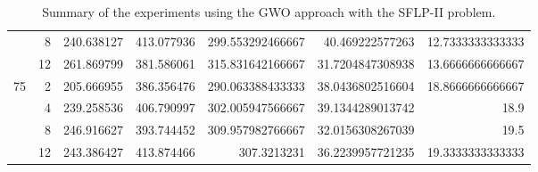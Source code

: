 \begin{table}
{{\begin{tabular}{|r|r|r|r|r|r|r|}
	\cline{2-7}
	& 8                               & 240.638127                         & 413.077936                          & 299.553292466667                   & 40.469222577263                         & 12.7333333333333                                \\ 
	\cline{2-7}
	& 12                              & 261.869799                         & 381.586061                          & 315.831642166667                   & 31.7204847308938                        & 13.6666666666667                                \\ 
	\hline
	\multirow{4}{*}{75}                      & 2                               & 205.666955                         & 386.356476                          & 290.063388433333                   & 38.0436802516604                        & 18.8666666666667                                \\ 
	\cline{2-7}
	& 4                               & 239.258536                         & 406.790997                          & 302.005947566667                   & 39.1344289013742                        & 18.9                                            \\ 
	\cline{2-7}
	& 8                               & 246.916627                         & 393.744452                          & 309.957982766667                   & 32.0156308267039                        & 19.5                                            \\ 
	\cline{2-7}
	& 12                              & 243.386427                         & 413.874466                          & 307.3213231                        & 36.2239957721235                        & 19.3333333333333                                \\
	\hline
\end{tabular}}}
\caption{Summary of the experiments using the GWO approach with the SFLP-II problem.}
\label{full-data-gwo-sflp-ii}
\end{table}

